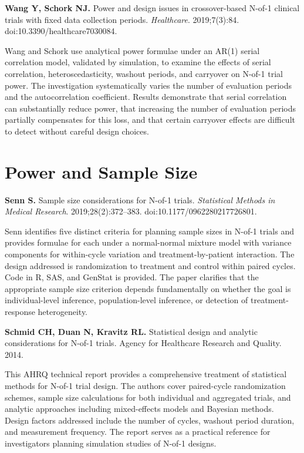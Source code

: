 \documentclass[11pt]{article}
\begin{document}
\medskip
\textbf{Wang Y, Schork NJ.} Power and design issues in
crossover-based N-of-1 clinical trials with fixed data
collection periods. \textit{Healthcare}. 2019;7(3):84.
doi:10.3390/healthcare7030084.

\smallskip\noindent
Wang and Schork use analytical power formulae under an
AR(1) serial correlation model, validated by simulation, to
examine the effects of serial correlation,
heteroscedasticity, washout periods, and carryover on
N-of-1 trial power. The investigation systematically varies
the number of evaluation periods and the autocorrelation
coefficient. Results demonstrate that serial correlation
can substantially reduce power, that increasing the number
of evaluation periods partially compensates for this loss,
and that certain carryover effects are difficult to detect
without careful design choices.

\section{Power and Sample Size}

\textbf{Senn S.} Sample size considerations for N-of-1
trials. \textit{Statistical Methods in Medical Research}.
2019;28(2):372--383. doi:10.1177/0962280217726801.

\smallskip\noindent
Senn identifies five distinct criteria for planning sample
sizes in N-of-1 trials and provides formulae for each under
a normal-normal mixture model with variance components for
within-cycle variation and treatment-by-patient interaction.
The design addressed is randomization to treatment and
control within paired cycles. Code in R, SAS, and GenStat
is provided. The paper clarifies that the appropriate sample
size criterion depends fundamentally on whether the goal is
individual-level inference, population-level inference, or
detection of treatment-response heterogeneity.

\medskip
\textbf{Schmid CH, Duan N, Kravitz RL.} Statistical design
and analytic considerations for N-of-1 trials. Agency for
Healthcare Research and Quality. 2014.

\smallskip\noindent
This AHRQ technical report provides a comprehensive
treatment of statistical methods for N-of-1 trial design.
The authors cover paired-cycle randomization schemes,
sample size calculations for both individual and aggregated
trials, and analytic approaches including mixed-effects
models and Bayesian methods. Design factors addressed
include the number of cycles, washout period duration, and
measurement frequency. The report serves as a practical
reference for investigators planning simulation studies of
N-of-1 designs.
\end{document}
